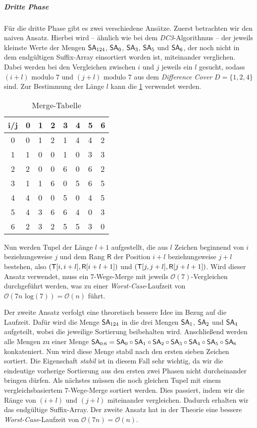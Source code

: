 \subparagraph*{Dritte Phase}

Für die dritte Phase gibt es zwei verschiedene Ansätze. Zuerst betrachten wir den naiven Ansatz. Hierbei wird -- ähnlich wie bei dem \emph{DC3}-Algorithmus -- der jeweils kleinste Werte der Mengen $\sa_{124}$, $\sa_0$, $\sa_3$, $\sa_5$ und  $\sa_6$, der noch nicht in dem endgültigen Suffix-Array einsortiert worden ist, miteinander verglichen. Dabei werden bei den Vergleichen zwischen $i$ und $j$ jeweils ein $l$ gesucht, sodass $(i + l) \text{ modulo } 7$ und $(j + l) \text{ modulo } 7$ aus dem \emph{Difference Cover} $D = \{1, 2, 4\}$ sind. Zur Bestimmung der Länge $l$ kann die \cref{tab:merge} verwendet werden.

\begin{table}[H]
	\centering
	\begin{tabular}{c|lllllll}
		i/j & 0 & 1 & 2 & 3 & 4 & 5 & 6 \\\hline
		0   & 0 & 1 & 2 & 1 & 4 & 4 & 2 \\
		1   & 1 & 0 & 0 & 1 & 0 & 3 & 3 \\
		2   & 2 & 0 & 0 & 6 & 0 & 6 & 2 \\
		3   & 1 & 1 & 6 & 0 & 5 & 6 & 5 \\
		4   & 4 & 0 & 0 & 5 & 0 & 4 & 5 \\
		5   & 4 & 3 & 6 & 6 & 4 & 0 & 3 \\
		6   & 2 & 3 & 2 & 5 & 5 & 3 & 0
	\end{tabular}
	\caption{Merge-Tabelle}
	\label{tab:merge}
\end{table}

Nun werden Tupel der Länge $l+1$ aufgestellt, die aus $l$ Zeichen beginnend von $i$ beziehungsweise $j$ und dem Rang $\mathsf{R}$ der Position $i+l$ beziehungsweise $j+l$ bestehen, also $(\inputtext[i, i+l], \mathsf{R}[i+l+1])$ und $(\inputtext[j, j+l], \mathsf{R}[j+l+1])$. Wird dieser Ansatz verwendet, muss ein 7-Wege-Merge mit jeweils $\mathcal{O}(7)$-Vergleichen durchgeführt werden, was zu einer \emph{Worst-Case}-Laufzeit von $\mathcal{O}(7n \text{ log} (7)) = \mathcal{O}(n) $ führt.

Der zweite Ansatz verfolgt eine theoretisch bessere Idee im Bezug auf die Laufzeit. Dafür wird die Menge $\sa_{124}$ in die drei Mengen $\sa_1$, $\sa_2$ und $\sa_4$ aufgeteilt, wobei die jeweilige Sortierung beibehalten wird. Anschließend werden alle Mengen zu einer Menge $\sa_{0:6} = \sa_0 \circ \sa_1 \circ \sa_2 \circ \sa_3 \circ \sa_4 \circ \sa_5 \circ \sa_6$ konkateniert. Nun wird diese Menge stabil nach den ersten sieben Zeichen sortiert. Die Eigenschaft \emph{stabil} ist in diesem Fall sehr wichtig, da wir die eindeutige vorherige Sortierung aus den ersten zwei Phasen nicht durcheinander bringen dürfen. Als nächstes müssen die noch gleichen Tupel mit einem vergleichsbasiertem $7$-Wege-Merge sortiert werden. Dies passiert, indem wir die Ränge von $(i+l)$ und $(j+l)$ miteinander vergleichen. Dadurch erhalten wir das endgültige Suffix-Array. Der zweite Ansatz hat in der Theorie eine bessere \emph{Worst-Case}-Laufzeit von $\mathcal{O}(7n) = \mathcal{O}(n)$.

